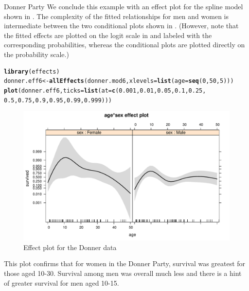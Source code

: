 \documentclass[11pt]{book}\usepackage[]{graphicx}\usepackage[]{color}
\makeatletter
\newcommand{\hlnum}[1]{\textcolor[rgb]{0.686,0.059,0.569}{#1}}%
\newcommand{\hlstd}[1]{\textcolor[rgb]{0.345,0.345,0.345}{#1}}%
\newcommand{\hlkwb}[1]{\textcolor[rgb]{0.69,0.353,0.396}{#1}}%
\newcommand{\hlkwc}[1]{\textcolor[rgb]{0.333,0.667,0.333}{#1}}%
\newcommand{\hlkwd}[1]{\textcolor[rgb]{0.737,0.353,0.396}{\textbf{#1}}}%
\newenvironment{kframe}{%
 \def\at@end@of@kframe{}%
 \ifinner\ifhmode%
  \def\at@end@of@kframe{\end{minipage}}%
  \begin{minipage}{\columnwidth}%
 \fi\fi%
 \def\FrameCommand##1{\hskip\@totalleftmargin \hskip-\fboxsep
 \colorbox{shadecolor}{##1}\hskip-\fboxsep
     \hskip-\linewidth \hskip-\@totalleftmargin \hskip\columnwidth}%
 \MakeFramed {\advance\hsize-\width
   \@totalleftmargin\z@ \linewidth\hsize
   \@setminipage}}%
 {\par\unskip\endMakeFramed%
 \at@end@of@kframe}
\newenvironment{knitrout}{}{} %
\renewenvironment{knitrout}{\small\renewcommand{\baselinestretch}{.85}}{} %
\makeatother
\begin{document}
\begin{Example}[donner1]{Donner Party}
We conclude this example with an effect plot for the spline model 
 shown in .
The complexity of the fitted relationships for men and women
is intermediate between the two conditional plots shown in 
.  (However, note that the fitted effects are
plotted on the logit scale in  and labeled
with the corresponding probabilities, whereas the conditional plots
are plotted directly on the probability scale.)


\begin{knitrout}
\color{fgcolor}\begin{kframe}
\begin{alltt}
\hlkwd{library}\hlstd{(effects)}
\hlstd{donner.eff6} \hlkwb{<-} \hlkwd{allEffects}\hlstd{(donner.mod6,} \hlkwc{xlevels}\hlstd{=}\hlkwd{list}\hlstd{(}\hlkwc{age}\hlstd{=}\hlkwd{seq}\hlstd{(}\hlnum{0}\hlstd{,}\hlnum{50}\hlstd{,}\hlnum{5}\hlstd{)))}
\hlkwd{plot}\hlstd{(donner.eff6,} \hlkwc{ticks}\hlstd{=}\hlkwd{list}\hlstd{(}\hlkwc{at}\hlstd{=}\hlkwd{c}\hlstd{(}\hlnum{0.001}\hlstd{,} \hlnum{0.01}\hlstd{,} \hlnum{0.05}\hlstd{,} \hlnum{0.1}\hlstd{,} \hlnum{0.25}\hlstd{,}
                                  \hlnum{0.5}\hlstd{,} \hlnum{0.75}\hlstd{,} \hlnum{0.9}\hlstd{,} \hlnum{0.95}\hlstd{,} \hlnum{0.99}\hlstd{,} \hlnum{0.999}\hlstd{)))}
\end{alltt}
\end{kframe}\begin{figure}[!htbp]


\centerline{\includegraphics[width=.8\textwidth]{ch07/fig/donner-effect-1} }

\caption[Effect plot for the Donner data]{Effect plot for the Donner data\label{fig:donner-effect}}
\end{figure}


\end{knitrout}
This plot confirms that for women in the Donner Party, survival was greatest for
those aged 10-30.  Survival among men was overall much less and there is a 
hint of greater survival for men aged 10-15.


\end{Example}
\end{document}
